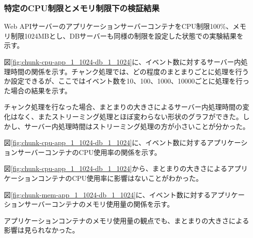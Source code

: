 \documentclass[../../../../main]{subfiles}
\begin{document}
    \subsubsection{特定のCPU制限とメモリ制限下の検証結果}\label{subsubsec:result-chunk-only-limit}

    Web APIサーバーのアプリケーションサーバーコンテナをCPU制限100\%、メモリ制限1024MBとし、DBサーバーも同様の制限を設定した状態での実験結果を示す。

    \label{subsubsubsec:result-chunk-only-limit-server-time}

    図\ref{fig:chunk-cpu-app_1_1024-db_1_1024}に、イベント数に対するサーバー内処理時間の関係を示す。チャンク処理では、どの程度のまとまりごとに処理を行うか設定できるが、ここではイベント数を10、100、1000、10000ごとに処理を行った場合の結果を示す。

    

    チャンク処理を行なった場合、まとまりの大きさによるサーバー内処理時間の変化はなく、またストリーミング処理とほぼ変わらない形状のグラフができた。しかし、サーバー内処理時間はストリーミング処理の方が小さいことが分かった。

    \label{subsubsubsec:result-chunk-only-limit-server-cpu}

    図\ref{fig:chunk-cpu-app_1_1024-db_1_1024}に、イベント数に対するアプリケーションサーバーコンテナのCPU使用率の関係を示す。

    

    図\ref{fig:chunk-cpu-app_1_1024-db_1_1024}から、まとまりの大きさによるアプリケーションコンテナのCPU使用率に影響はないことがわかった。

    \label{subsubsubsec:result-chunk-only-limit-server-memory}

    図\ref{fig:chunk-mem-app_1_1024-db_1_1024}に、イベント数に対するアプリケーションサーバーコンテナのメモリ使用量の関係を示す。

    

    アプリケーションコンテナのメモリ使用量の観点でも、まとまりの大きさによる影響は見られなかった。
\end{document}

